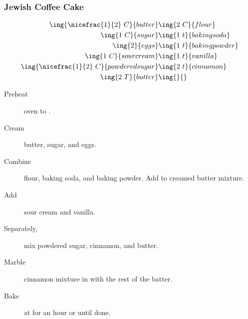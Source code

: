 \subsubsection{Jewish Coffee Cake}

\begin{align*}
    \ing{\nicefrac{1}{2}~C}{butter}         & \ing{2~C}{flour} \\
    \ing{1~C}{sugar}                        & \ing{1~t}{baking soda} \\
    \ing{2}{eggs}                           & \ing{1~t}{baking powder} \\
    \ing{1~C}{sour cream}                   & \ing{1~t}{vanilla} \\
    \ing{\nicefrac{1}{2}~C}{powdered sugar} & \ing{2~t}{cinnamon} \\
    \ing{2~T}{butter}                       & \ing{}{}
\end{align*}

\begin{description}
    \item[Preheat]oven to .
    \item[Cream]butter, sugar, and eggs.
    \item[Combine]flour, baking soda, and baking powder. Add to creamed butter mixture.
    \item[Add]sour cream and vanilla.
    \item[Separately,]mix powdered sugar, cinnamon, and butter.
    \item[Marble]cinnamon mixture in with the rest of the batter.
    \item[Bake]at  for an hour or until done.
\end{description}

\pagebreak
